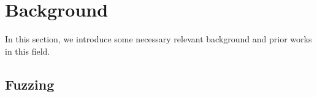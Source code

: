 \section{Background}
\label{sec:greybox-background}
In this section, we introduce some necessary relevant background and prior works in this field.




\subsection{Fuzzing}


